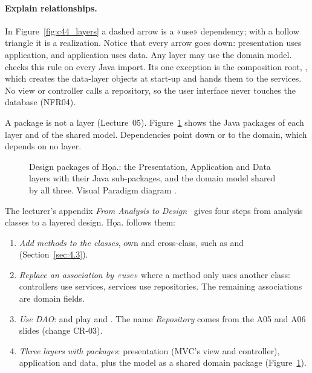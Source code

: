 
\paragraph{Explain relationships.} In Figure~\ref{fig:c44_layers} a dashed arrow is a «use» dependency; with a
hollow triangle it is a realization. Notice that every arrow goes down: presentation uses application, and
application uses data. Any layer may use the domain model.  checks this rule on
every Java import. Its one exception is the composition root, , which creates the data-layer
objects at start-up and hands them to the services. No view or controller calls a repository, so the user interface
never touches the database (NFR04).

A package is not a layer (Lecture~05). Figure~\ref{fig:c44_packages} shows the Java packages of each layer and of
the shared model. Dependencies point down or to the domain, which depends on no layer.

\begin{figure}[H]
\centering
{}
\caption[Design packages and their dependencies]{Design packages of Họa.: the Presentation, Application and Data layers with their Java sub-packages, and the domain model shared by all three. Visual Paradigm diagram .}\label{fig:c44_packages}
\end{figure}

The lecturer's appendix \emph{From Analysis to Design}~\cite{analysis2design} gives four steps from analysis classes
to a layered design. Họa. follows them:
\begin{enumerate}
\item \emph{Add methods to the classes}, own and cross-class, such as  and
 (Section~\ref{sec:4.3}).
\item \emph{Replace an association by «use»} where a method only uses another class: controllers use services,
services use repositories. The remaining associations are domain fields.
\item \emph{Use DAO}:  and  play  and
. The name \emph{Repository} comes from the A05 and A06 slides (change CR-03).
\item \emph{Three layers with packages}: presentation (MVC's view and controller), application and data, plus the
model as a shared domain package (Figure~\ref{fig:c44_packages}).
\end{enumerate}

